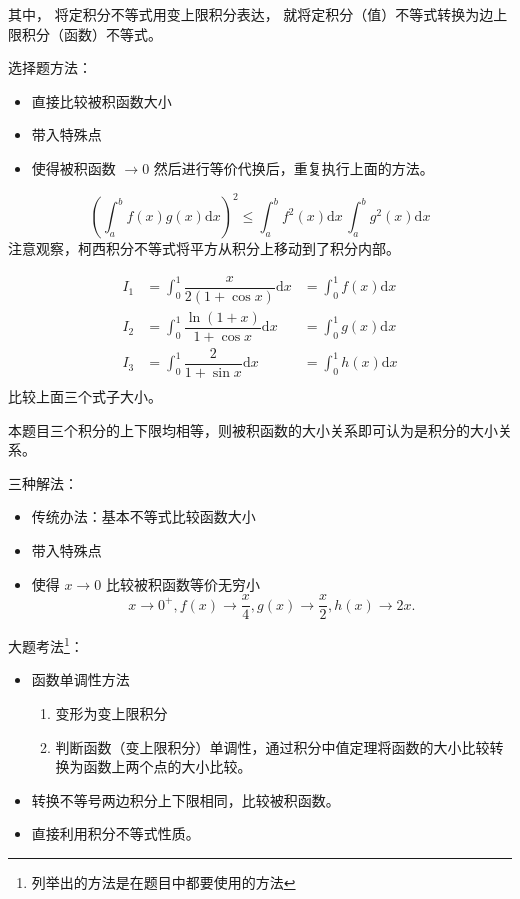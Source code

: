 其中，
将定积分不等式用变上限积分表达，
就将定积分（值）不等式转换为边上限积分（函数）不等式。

选择题方法：
\begin{itemize}
    \item 直接比较被积函数大小 
    \item 带入特殊点
    \item 使得被积函数 $\to 0$ 然后进行等价代换后，重复执行上面的方法。
\end{itemize}

\begin{theorem}\label{Cauchy-integral-inequlity}
    \[
        \left(\int_a^b f(x)g(x) \mathrm{d}x\right)^2 
        \leq 
        \int_a^b f^2(x) \mathrm{d}x\, \int_a^b g^2(x) \mathrm{d}x
    \]
    注意观察，柯西积分不等式将平方从积分上移动到了积分内部。
\end{theorem}

\begin{example}
    \begin{align*}
        I_1 &= \int_0^1 \dfrac{x}{2(1+\cos x)} \mathrm{d}x     &= \int_0^1 f(x) \mathrm{d}x \\
        I_2 &= \int_0^1 \dfrac{\ln(1+x)}{1+\cos x} \mathrm{d}x &= \int_0^1 g(x) \mathrm{d}x \\
        I_3 &= \int_0^1 \dfrac{2}{1+\sin x} \mathrm{d}x        &= \int_0^1 h(x) \mathrm{d}x \\
    \end{align*}
    比较上面三个式子大小。

    本题目三个积分的上下限均相等，则被积函数的大小关系即可认为是积分的大小关系。

    三种解法：
    \begin{itemize}
        \item 传统办法：基本不等式比较函数大小
        \item 带入特殊点
        \item 使得 $x\to 0$ 比较被积函数等价无穷小
            \[
                x \to 0^+, f(x) \to \dfrac{x}{4}, g(x) \to \dfrac{x}{2}, h(x) \to 2x.
            \]
    \end{itemize}
\end{example}

大题考法\footnote{列举出的方法是在题目中都要使用的方法}：
\begin{itemize}
    \item 函数单调性方法
        \begin{enumerate}
            \item 变形为变上限积分
            \item 判断函数（变上限积分）单调性，通过积分中值定理将函数的大小比较转换为函数上两个点的大小比较。
        \end{enumerate}
    \item 转换不等号两边积分上下限相同，比较被积函数。
    \item 直接利用积分不等式性质。
\end{itemize}

